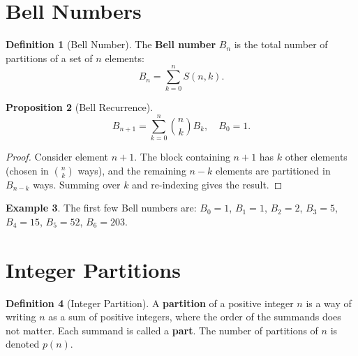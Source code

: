 \documentclass[12pt,a4paper,openany]{book}
\theoremstyle{definition}
\newtheorem{definition}{Definition}[chapter]
\newtheorem{example}[definition]{Example}
\theoremstyle{plain}
\newtheorem{proposition}[definition]{Proposition}
\theoremstyle{remark}
\begin{document}

\section{Bell Numbers}\label{sec:bell-numbers}

\begin{definition}[Bell Number]\label{def:bell}
The \textbf{Bell number} $B_n$ is the
total number of partitions of a set of $n$ elements:
\[
  B_n = \sum_{k=0}^{n} S(n,k).
\]
\end{definition}

\begin{proposition}[Bell Recurrence]\label{prop:bell-recurrence}
\[
  B_{n+1} = \sum_{k=0}^{n}\binom{n}{k} B_k, \quad B_0 = 1.
\]
\end{proposition}

\begin{proof}
Consider element $n+1$.  The block containing $n+1$ has $k$ other
elements (chosen in $\binom{n}{k}$ ways), and the remaining $n-k$
elements are partitioned in $B_{n-k}$ ways.  Summing over $k$ and
re-indexing gives the result.
\end{proof}

\begin{example}\label{ex:bell-values}
The first few Bell numbers are:
$B_0=1$, $B_1=1$, $B_2=2$, $B_3=5$, $B_4=15$, $B_5=52$, $B_6=203$.
\end{example}



\section{Integer Partitions}\label{sec:integer-partitions}

\begin{definition}[Integer Partition]\label{def:integer-partition}
A \textbf{partition} of a positive integer $n$ is a way of writing $n$
as a sum of positive integers, where the order of the summands does not
matter.  Each summand is called a \textbf{part}.  The number
of partitions of $n$ is denoted $p(n)$.
\end{definition}
\end{document}
